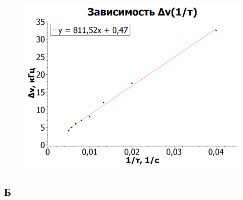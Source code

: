\documentclass[a4paper, 12pt]{article}%
\begin{document}
\begin{enumerate}
\begin{figure}[h!]
\centering
\includegraphics[scale=0.8]{images/graph1.png}
\label{fig:Image1}
\end{figure}

\end{enumerate}

\newpage

\subsection*{Б}
\end{document}
